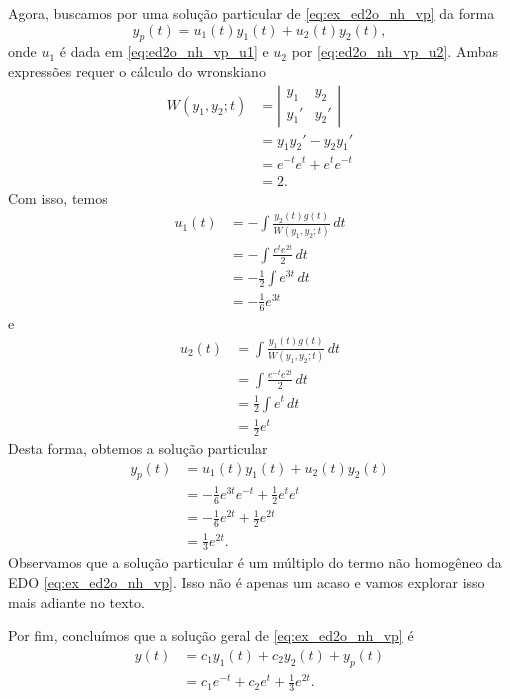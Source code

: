 \begin{ex}
  Agora, buscamos por uma solução particular de \eqref{eq:ex_ed2o_nh_vp} da forma
  \begin{equation}
    y_p(t) = u_1(t)y_1(t) + u_2(t)y_2(t),
  \end{equation}
  onde $u_1$ é dada em \eqref{eq:ed2o_nh_vp_u1} e $u_2$ por \eqref{eq:ed2o_nh_vp_u2}. Ambas expressões requer o cálculo do wronskiano
  \begin{align}
    W(y_1,y_2;t) &= \left|
                   \begin{matrix}
                     y_1 & y_2 \\
                     y_1' & y_2'
                   \end{matrix}
                            \right| \\
                 &= y_1y_2' - y_2y_1' \\
                 &= e^{-t}e^t + e^te^{-t} \\
                 &= 2.
  \end{align}
  Com isso, temos
  \begin{align}
    u_1(t) &= -\int \frac{y_2(t)g(t)}{W(y_1,y_2;t)}\,dt \\
           &= -\int \frac{e^te^{2t}}{2}\,dt \\
           &= -\frac{1}{2}\int e^{3t}\,dt \\
           &= -\frac{1}{6}e^{3t}
  \end{align}
  e
  \begin{align}
    u_2(t) &= \int \frac{y_1(t)g(t)}{W(y_1,y_2;t)}\,dt \\
           &= \int \frac{e^{-t}e^{2t}}{2}\,dt \\
           &= \frac{1}{2}\int e^{t}\,dt \\
           &= \frac{1}{2}e^{t}
  \end{align}
  Desta forma, obtemos a solução particular
  \begin{align}
    y_p(t) &= u_1(t)y_1(t) + u_2(t)y_2(t) \\
           &= -\frac{1}{6}e^{3t}e^{-t} + \frac{1}{2}e^{t}e^{t} \\
           &= -\frac{1}{6}e^{2t} + \frac{1}{2}e^{2t} \\
           &= \frac{1}{3}e^{2t}.
  \end{align}
  Observamos que a solução particular é um múltiplo do termo não homogêneo da EDO \eqref{eq:ex_ed2o_nh_vp}. Isso não é apenas um acaso e vamos explorar isso mais adiante no texto.

  Por fim, concluímos que a solução geral de \eqref{eq:ex_ed2o_nh_vp} é
  \begin{align}
    y(t) &= c_1y_1(t) + c_2y_2(t) + y_p(t) \\
         &= c_1e^{-t} + c_2e^t + \frac{1}{3}e^{2t}.
  \end{align}
\end{ex}

